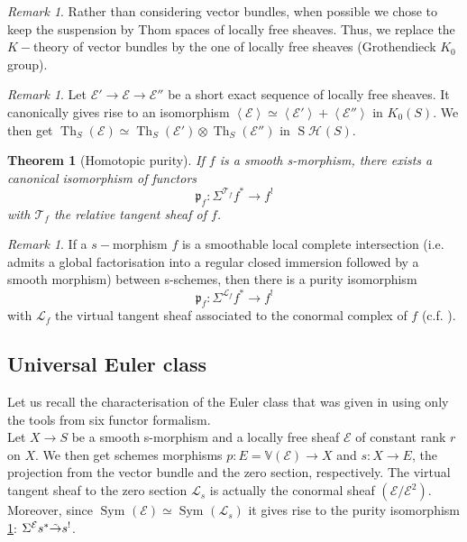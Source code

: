 \documentclass{amsart}
\theoremstyle{plain}%
\newtheorem{tho}[subsubsection]{Theorem}
\theoremstyle{remark}
\newtheorem{rmq}[subsubsection]{Remark}
\theoremstyle{definition}
\newcommand{\cE}{\mathcal{E}}
\newcommand{\cH}{\mathcal{H}}
\newcommand{\cL}{\mathcal{L}}
\newcommand{\cT}{\mathcal{T}}
\newcommand{\eV}{\mathbb{V}}
\newcommand{\fp}{\mathfrak{p}}
\newcommand{\Thom}[2][]{\operatorname{Th}_{#1}\left(#2\right)}
\newcommand{\StableHo}[2][]{\operatorname{S}\!\cH^{#1}\!\left(#2\right)}
\newcommand{\qscal}[1]{\left\langle #1 \right\rangle}
\newcommand{\isomr}{\Tilde{\to}}
\newcommand{\Symalg}[2][]{\operatorname{Sym}^{#1}\left(#2\right)}
\begin{document}
\begin{rmq}
Rather than considering vector bundles, when possible we chose to keep the suspension by Thom spaces of locally free sheaves. Thus, we replace the $K-$theory of vector bundles by the one of locally free sheaves (Grothendieck $K_0$ group).
\end{rmq}


\begin{rmq}
Let $\cE'\to \cE \to \cE''$ be a short exact sequence of locally free sheaves. It canonically gives rise to an isomorphism $\qscal{\cE} \simeq \qscal{\cE'} + \qscal{\cE''}$ in $K_0(S)$. We then get $\Thom[S]{\cE} \simeq \Thom[S]{\cE'}\otimes\Thom[S]{\cE''}$ in $\StableHo{S}$.
\end{rmq}


\begin{tho}[Homotopic purity]\label{THO - purete version six foncteurs}
If $f$ is a smooth s-morphism, there exists a canonical isomorphism of functors 
\[\fp_f : \Sigma^{\cT_f}f^\ast \to f^!\]
with $\cT_f$ the relative tangent sheaf of $f$.
\end{tho}

\begin{rmq}
If a $s-$morphism $f$ is a smoothable local complete intersection (i.e. admits a global factorisation into a regular closed immersion followed by a smooth morphism) between s-schemes, then there is a purity isomorphism
\[\fp_f : \Sigma^{\cL_f}f^\ast \to f^!\]
with $\cL_f$ the virtual tangent sheaf associated to the conormal complex of $f$ (c.f. \cite[Paragraph 4.3.1]{DJK21}).
\end{rmq}



\subsection{Universal Euler class}\label{SSEC - classe Euler universelle}

Let us recall the characterisation of the Euler class that was given in \cite[Section 2]{Cha_dP2-4} using only the tools from six functor formalism.\\

Let $X \to S$ be a smooth s-morphism and a locally free sheaf $\cE$ of constant rank $r$ on $X$. We then get schemes morphisms $p : E = \eV(\cE) \to X$ and $s : X \to E$, the projection from the vector bundle and the zero section, respectively. The virtual tangent sheaf to the zero section $\cL_s$ is actually
the conormal sheaf $(\cE/\cE^{2})$.
Moreover, since $\Symalg{\cE} \simeq \Symalg{\cL_s}$ it gives rise to the purity isomorphism \ref{THO - purete version six foncteurs}: $\Sigma^{\cE} s^\ast \isomr s^!$.
\end{document}
